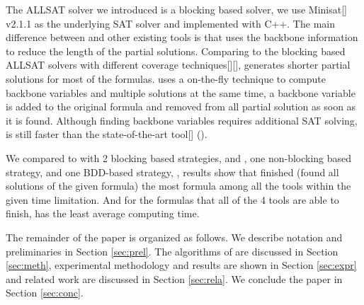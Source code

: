 The ALLSAT solver \tool we introduced is a blocking based solver, we use Minisat[] v2.1.1 as the underlying SAT solver and implemented \tool with C++. The main difference between \tool and other existing tools is that \tool uses the backbone information to reduce the length of the partial solutions. Comparing to the  blocking based ALLSAT solvers with different coverage techniques[][], \tool generates shorter partial solutions for most of the formulas. \tool uses a on-the-fly technique to compute backbone variables and multiple solutions at the same time, a backbone variable is added to the original formula and removed from all partial solution as soon as it is found. Although finding backbone variables requires additional SAT solving, \tool is still faster than the state-of-the-art tool[] (\ctool).

We compared to \tool with 2 blocking based strategies, \ctool[] and \bc[], one non-blocking based strategy, \nbc[] and one BDD-based strategy, \bdd[], results show that \tool finished (found all solutions of the given formula) the most formula among all the tools within the given time limitation. And for the formulas that all of the 4 tools are able to finish, \tool has the least average computing time.

The remainder of the paper is organized as follows. We describe notation and preliminaries in Section \ref{sec:prel}. The algorithms of \tool are discussed in Section \ref{sec:meth}, experimental methodology and results are shown in Section \ref{sec:expr} and related work are discussed in Section \ref{sec:rela}. We conclude the paper in Section \ref{sec:conc}.

